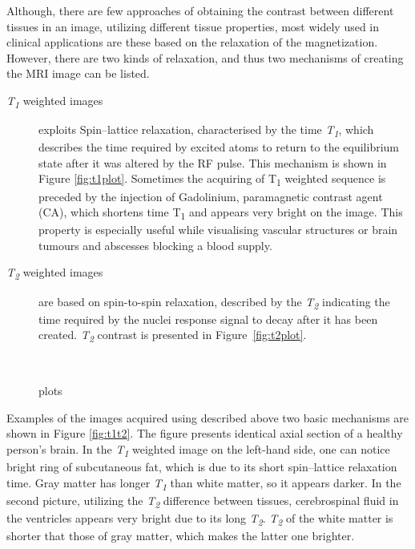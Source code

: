 Although, there are few approaches of obtaining the contrast between different tissues in an image, utilizing different tissue properties, most widely used in clinical applications are these based on the relaxation of the magnetization. However, there are two kinds of relaxation, and thus two mechanisms of creating the MRI image can be listed.
\begin{description}
		\item [\textit{T\textsubscript{1}} weighted images] exploits Spin–lattice relaxation, characterised by the time \textit{T\textsubscript{1}}, which describes the time required by excited atoms to return to the equilibrium state after it was altered by the RF pulse. This mechanism is shown in Figure \ref{fig:t1plot}. Sometimes the acquiring of T\textsubscript{1} weighted sequence is preceded by the injection of Gadolinium, paramagnetic contrast agent (CA), which  shortens time {T\textsubscript{1}} and appears very bright on the image. This property is especially useful while visualising vascular structures or brain tumours and abscesses blocking a blood supply.   
		
		\item [\textit{T\textsubscript{2}} weighted images] are based on spin-to-spin relaxation, described by the \textit{T\textsubscript{2}} indicating the time required by the nuclei response signal to decay after it has been created. \textit{T\textsubscript{2}} contrast is presented in Figure~\ref{fig:t2plot}. 
\end{description}
\begin{figure}[H]
\captionsetup[subfloat]{captionskip=0.5cm}
	\centering
	\hspace{1.5cm}
	\\	
\vspace{0.5cm}
\caption{plots}
\label{fig:t1t2plot}
\end{figure}
Examples of the images acquired using described above two basic mechanisms are shown in Figure \ref{fig:t1t2}. 
The figure presents identical axial section of a healthy person's brain. In the \textit{T\textsubscript{1}} weighted  image on the left-hand side, one can notice bright ring of subcutaneous fat, which is due to its short spin–lattice relaxation time. Gray matter has longer \textit{T\textsubscript{1}} than white matter, so it appears darker. In the second picture, utilizing the \textit{T\textsubscript{2}} difference between tissues, cerebrospinal fluid in the ventricles appears very bright due to its long  \textit{T\textsubscript{2}}. \textit{T\textsubscript{2}} of the white matter is shorter that those of gray matter, which makes the latter one brighter.  
